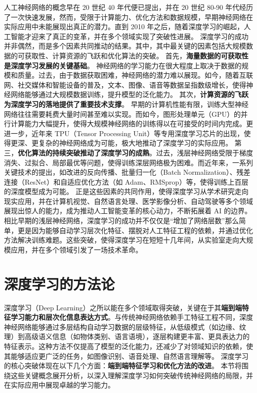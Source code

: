 人工神经网络的概念早在 20 世纪 40 年代便已提出，并在 20 世纪 80-90 年代经历了一次快速发展，然而，受限于计算能力、优化方法和数据规模，早期神经网络在实际应用中未能展现出真正的潜力。直到 2010 年之后，随着深度学习的崛起，人工智能才迎来了真正的变革，并在多个领域实现了突破性进展。
深度学习的成功并非偶然，而是多个因素共同推动的结果。其中，其中最关键的因素包括大规模数据的可获取性、计算资源的飞跃和优化算法的突破。%
首先，{\bf  海量数据的可获取性是深度学习发展的关键基础}。
神经网络的学习能力在很大程度上取决于数据的规模和质量。过去，由于数据获取困难，神经网络的潜力难以展现。如今，随着互联网、社交媒体和智能设备的普及，文本、图像、语音等数据呈指数级增长，使得神经网络能够通过大规模数据训练，提升模型的泛化能力。
其次，{\bf 计算资源的飞跃为深度学习的落地提供了重要技术支撑}。
早期的计算机性能有限，训练大型神经网络往往需要耗费大量时间甚至难以实现。而如今，图形处理单元（GPU）的并行计算能力大幅提升，使得大规模神经网络的训练得以在可接受的时间内完成。更进一步，近年来 TPU（Tensor Processing Unit）等专用深度学习芯片的出现，使得更深、更复杂的神经网络成为可能，极大地推动了深度学习的实际应用。
第三，{\bf 优化算法的持续突破推动了深度学习的成熟}。过去，浅层神经网络受限于梯度消失、过拟合、局部最优等问题，使得训练深层网络极为困难。而近年来，一系列关键技术的提出，如改进的反向传播、批量归一化（Batch Normalization）、残差连接（ResNet）和自适应优化方法（如 Adam、RMSprop）等，使得训练上百层的深度模型成为可能。
正是这些因素的共同作用，使得深度学习从学术研究走向现实应用，并在计算机视觉、自然语言处理、医学影像分析、自动驾驶等多个领域展现出惊人的能力，成为推动人工智能变革的核心动力，不断拓展着 AI 的边界。
相比早期的浅层神经网络，深度学习的成功并不仅仅是“增加了网络层数”那么简单，更是因为能够自动学习层次化特征、摆脱对人工特征工程的依赖，并通过优化方法解决训练难题。这些突破，使得深度学习在短短十几年间，从实验室走向大规模应用，并在多个领域引发了一场技术革命。


 \section{深度学习的方法论}

深度学习（Deep Learning）之所以能在多个领域取得突破，关键在于其{\bf 端到端特征学习能力和层次化信息表达方式}。与传统神经网络依赖手工特征工程不同，深度神经网络能够通过多层结构自动学习数据的层级特征，从低级模式（如边缘、纹理）到高级语义信息（如物体类别、语言语境），逐层构建更丰富、更具表达力的特征表示。这种方法不仅提高了模型的泛化能力，还减少了对领域知识的依赖，使其能够适应更广泛的任务，如图像识别、语音处理、自然语言理解等。
深度学习的核心突破体现在以下几个方面：{\bf 端到端特征学习和优化方法的改进}。
本节将围绕这些关键概念展开分析，以深入理解深度学习如何突破传统神经网络的局限，并在实际应用中展现卓越的学习能力。
